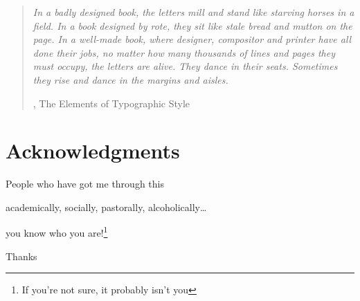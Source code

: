 \cleardoublepage

\begin{quote}{\slshape    
    In a badly designed book, the letters mill 
    and stand like starving horses in a field.
    In a book designed by rote, they sit 
    like stale bread and mutton on the page. 
    In a well-made book, where designer, compositor
    and printer have all done their jobs, 
    no matter how many thousands of lines and pages 
    they must occupy, the letters are alive. 
    They dance in their seats. 
    Sometimes they rise and dance in the margins and aisles. }

    , The Elements of Typographic Style
\end{quote}



\vspace{1in}

\begingroup
\let\clearpage\relax
\let\cleardoublepage\relax
\let\cleardoublepage\relax
\chapter*{Acknowledgments}

\medskip

\begin{center}
 People who have got me through this
\end{center}

\medskip

\begin{center}
academically, socially, pastorally, alcoholically\ldots
\end{center}

\medskip

\begin{center}
you know who you are!\footnote{If you're not sure, it probably isn't you}
\end{center}

\medskip

\begin{center}
Thanks
\end{center}

\medskip


\endgroup



